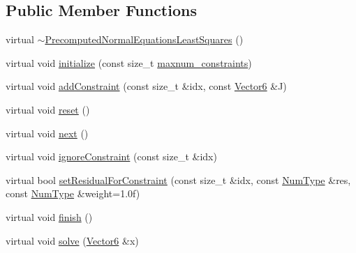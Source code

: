 \subsection*{Public Member Functions}
\begin{DoxyCompactItemize}
\item 
virtual \mbox{\hyperlink{classdvo_1_1core_1_1_precomputed_normal_equations_least_squares_aaadc7769e3857383066d302426d3cf3a}{$\sim$\+Precomputed\+Normal\+Equations\+Least\+Squares}} ()
\item 
virtual void \mbox{\hyperlink{classdvo_1_1core_1_1_precomputed_normal_equations_least_squares_a51e5717e0add36b37db3617d35c87c87}{initialize}} (const size\+\_\+t \mbox{\hyperlink{classdvo_1_1core_1_1_precomputed_normal_equations_least_squares_aac9bca6070c75a91e4c2777b137df9a2}{maxnum\+\_\+constraints}})
\item 
virtual void \mbox{\hyperlink{classdvo_1_1core_1_1_precomputed_normal_equations_least_squares_a8fda94e1f0b88e65f2f3c7e98597f662}{add\+Constraint}} (const size\+\_\+t \&idx, const \mbox{\hyperlink{namespacedvo_1_1core_a05327f3312d32a301bce9fccda9e5807}{Vector6}} \&J)
\item 
virtual void \mbox{\hyperlink{classdvo_1_1core_1_1_precomputed_normal_equations_least_squares_a591e3030f4736c580e37338ba747bc83}{reset}} ()
\item 
virtual void \mbox{\hyperlink{classdvo_1_1core_1_1_precomputed_normal_equations_least_squares_a514bd37f6bbfeb8cb1788e6fdabc0e32}{next}} ()
\item 
virtual void \mbox{\hyperlink{classdvo_1_1core_1_1_precomputed_normal_equations_least_squares_a3abc1c62317598bbbacf3b021d39bff3}{ignore\+Constraint}} (const size\+\_\+t \&idx)
\item 
virtual bool \mbox{\hyperlink{classdvo_1_1core_1_1_precomputed_normal_equations_least_squares_a5eb65ee043d392def0ab917ec18cf6ef}{set\+Residual\+For\+Constraint}} (const size\+\_\+t \&idx, const \mbox{\hyperlink{namespacedvo_1_1core_ab9c199d221775a923e2549ad7e15c323}{Num\+Type}} \&res, const \mbox{\hyperlink{namespacedvo_1_1core_ab9c199d221775a923e2549ad7e15c323}{Num\+Type}} \&weight=1.\+0f)
\item 
virtual void \mbox{\hyperlink{classdvo_1_1core_1_1_precomputed_normal_equations_least_squares_a57b83cc3f829f4416b09d4334206a592}{finish}} ()
\item 
virtual void \mbox{\hyperlink{classdvo_1_1core_1_1_precomputed_normal_equations_least_squares_a9749ed4314ae7ed7dbfa05c35a9e4a51}{solve}} (\mbox{\hyperlink{namespacedvo_1_1core_a05327f3312d32a301bce9fccda9e5807}{Vector6}} \&x)
\end{DoxyCompactItemize}

